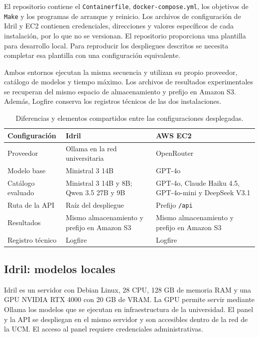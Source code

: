 El repositorio contiene el \texttt{Containerfile}, \texttt{docker-compose.yml}, los objetivos de \texttt{Make} y los programas de arranque y reinicio. Los archivos de configuración de Idril y EC2 contienen credenciales, direcciones y valores específicos de cada instalación, por lo que no se versionan. El repositorio proporciona una plantilla para desarrollo local. Para reproducir los despliegues descritos se necesita completar esa plantilla con una configuración equivalente.

Ambos entornos ejecutan la misma secuencia y utilizan su propio proveedor, catálogo de modelos y tiempo máximo. Los archivos de resultados experimentales se recuperan del mismo espacio de almacenamiento y prefijo en Amazon S3. Además, Logfire conserva los registros técnicos de las dos instalaciones.

\begin{table}[htbp]
\centering
\small
\renewcommand{\arraystretch}{1.16}
\begin{tabularx}{\textwidth}{@{}Z{3.2cm}YY@{}}
\toprule
\textbf{Configuración} & \textbf{Idril} & \textbf{AWS EC2} \\
\midrule
Proveedor & Ollama en la red universitaria & OpenRouter \\
Modelo base & Ministral 3 14B & GPT-4o \\
Catálogo evaluado & Ministral 3 14B y 8B; Qwen 3.5 27B y 9B & GPT-4o, Claude Haiku 4.5, GPT-4o-mini y DeepSeek V3.1 \\
Ruta de la API & Raíz del despliegue & Prefijo \texttt{/api} \\
Resultados & Mismo almacenamiento y prefijo en Amazon S3 & Mismo almacenamiento y prefijo en Amazon S3 \\
Registro técnico & Logfire & Logfire \\
\bottomrule
\end{tabularx}
\caption{Diferencias y elementos compartidos entre las configuraciones desplegadas.}
\label{tab:environment-config}
\end{table}

\subsection{Idril: modelos locales}

Idril es un servidor con Debian Linux, 28 CPU, 128 GB de memoria RAM y una GPU NVIDIA RTX 4000 con 20 GB de VRAM. La GPU permite servir mediante Ollama los modelos que se ejecutan en infraestructura de la universidad. El panel y la API se despliegan en el mismo servidor y son accesibles dentro de la red de la UCM. El acceso al panel requiere credenciales administrativas.

